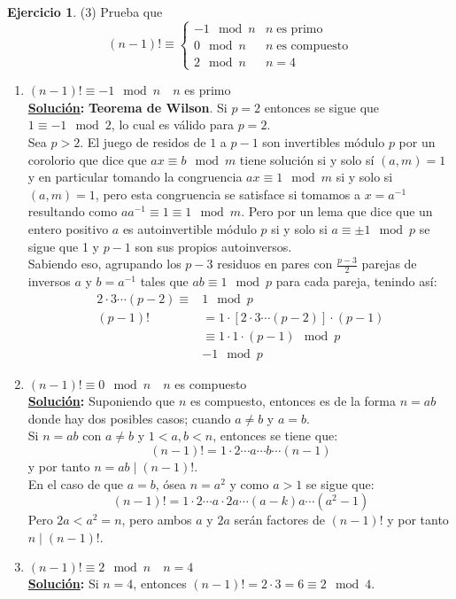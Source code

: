 \documentclass[11pt,letterpaper]{article}
\theoremstyle{definition}\newtheorem{p}{Ejercicio}
\newcommand{\sol}{\textbf{\underline{Solución}: }} %
\begin{document}
\begin{p}(3)
Prueba que
    \[
      (n-1)! \equiv
      \begin{cases}
        -1\mod n & n\;\text{es primo} \\
        0\mod n & n\;\text{es compuesto} \\
        2\mod n & n=4
      \end{cases}
    \]

\begin{enumerate}
    \item $(n-1)! \equiv -1 \mod{n} \quad n$ es primo\\
    \sol \textbf{Teorema de Wilson}. Si $p=2$ entonces se sigue que $1 \equiv -1 \mod{2}$, lo cual es 
    válido para $p=2$.\\
    Sea $p>2$. El juego de residos de $1$ a $p-1$ son invertibles módulo $p$ por un corolorio que dice
    que $ax \equiv b \mod{m}$ tiene solución si y solo sí $(a,m) = 1$ y en particular tomando la
    congruencia $ax \equiv 1 \mod m$ si y solo si $(a,m) = 1$, pero esta congruencia se satisface si 
    tomamos a $x = a^{-1}$ resultando como $a a^{-1} \equiv 1 \equiv 1 \mod{m}$. Pero por un lema que dice
    que un entero positivo $a$ es autoinvertible módulo $p$ si y solo si $a \equiv \pm 1 \mod{p}$ se
    sigue que 1 y $p-1$ son sus propios autoinversos.\\
    Sabiendo eso, agrupando los $p-3$ residuos en pares con $\frac{p-3}{2}$ parejas de inversos $a$
    y $b=a^{-1}$ tales que $ab \equiv 1 \mod{p}$ para cada pareja, tenindo así:
    \begin{align*}
        2 \cdot 3 \cdots (p-2) \equiv & 1 \mod{p}\\
        (p-1)! &= 1 \cdot [2 \cdot 3 \cdots (p-2)] \cdot (p-1)\\
            &\equiv 1 \cdot 1 \cdot (p-1) \mod{p}\\
            &-1 \mod{p}
    \end{align*}

    \item $(n-1)! \equiv 0 \mod{n} \quad n$ es compuesto\\
    \sol Suponiendo que $n$ es compuesto, entonces es de la forma $n=ab$ donde hay dos posibles
    casos; cuando $a \neq b$ y $a = b$.\\
    Si $n=ab$ con $a \neq b$ y $1 < a,b < n$, entonces se tiene que:
    $$(n-1)! = 1 \cdot 2 \cdots a \cdots b \cdots (n-1)$$
    y por tanto $n = ab \mid (n-1)!$.\\
    En el caso de que $a = b$, ósea $n = a^2$ y como $a > 1$ se sigue que:
    $$(n-1)! = 1 \cdot 2 \cdots a \cdot 2a \cdots (a-k)a \cdots (a^2 - 1)$$
    Pero $2a < a^2 = n$, pero ambos $a$ y $2a$ serán factores de $(n-1)!$ y por tanto
    $n \mid (n-1)!$.


    \item $(n-1)! \equiv 2 \mod{n} \quad n=4$\\
    \sol Si $n = 4$, entonces $(n-1)! = 2 \cdot 3 = 6 \equiv 2 \mod{4}$.
\end{enumerate}
\end{p}
\end{document}
